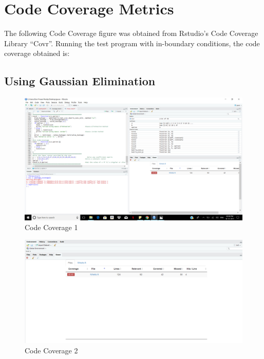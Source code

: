 \documentclass[12pt, titlepage]{article}
\begin{document}
\section{Code Coverage Metrics}

The following Code Coverage figure was obtained from Rstudio's 
Code Coverage Library \enquote{Covr}. Running the test program with in-boundary
conditions, the code coverage obtained is:\\

\subsection{Using Gaussian Elimination}

\begin{figure}[H]
\centering
 \includegraphics[width=150mm]{CV8}
  \caption{Code Coverage 1}
  \label{fig:CV8}
\end{figure}

\begin{figure}[H]
\centering
 \includegraphics[width=150mm]{CV}
  \caption{Code Coverage 2}
  \label{fig:CV}
\end{figure}
\end{document}

